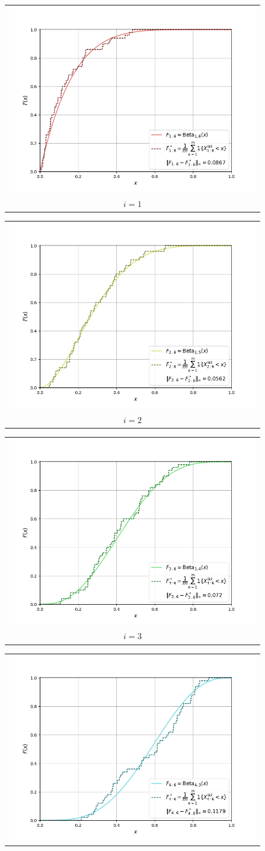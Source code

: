 \begin{figure}[H]
    \centering
    \begin{tabular}{@{}c@{}}
        \includegraphics[trim={1.1cm 0.5cm 1.5cm 0cm}, clip,width=.46\linewidth]{../simulation/unif_order_1:6.png} \\
        $i = 1$
      \end{tabular}
    \begin{tabular}{@{}c@{}}
        \includegraphics[trim={1.1cm 0.5cm 1.5cm 0cm}, clip,width=.46\linewidth]{../simulation/unif_order_2:6.png} \\
        $i = 2$
    \end{tabular}
    \begin{tabular}{@{}c@{}}
        \includegraphics[trim={1.1cm 0.5cm 1.5cm 0cm}, clip,width=.46\linewidth]{../simulation/unif_order_3:6.png} \\
        $i = 3$
      \end{tabular}
    \begin{tabular}{@{}c@{}}
        \includegraphics[trim={1.1cm 0.5cm 1.5cm 0cm}, clip,width=.46\linewidth]{../simulation/unif_order_4:6.png} \\

\end{tabular}
\end{figure}
